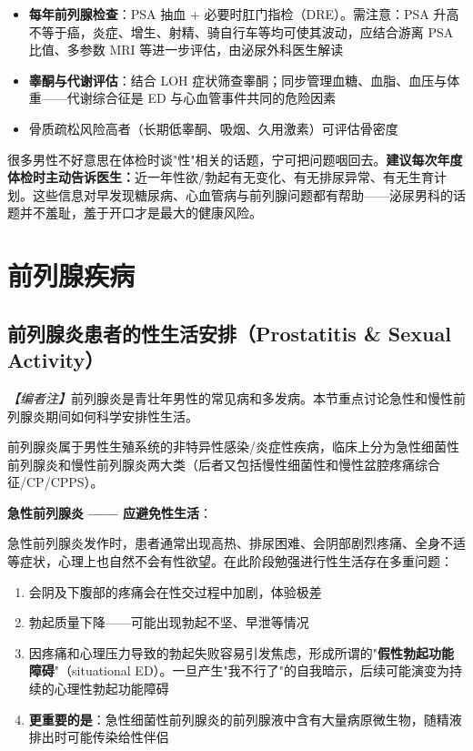\begin{itemize}
	\item \textbf{每年前列腺检查}：PSA 抽血 + 必要时肛门指检（DRE）。需注意：PSA 升高不等于癌，炎症、增生、射精、骑自行车等均可使其波动，应结合游离 PSA 比值、多参数 MRI 等进一步评估，由泌尿外科医生解读
	\item \textbf{睾酮与代谢评估}：结合 LOH 症状筛查睾酮；同步管理血糖、血脂、血压与体重——代谢综合征是 ED 与心血管事件共同的危险因素
	\item 骨质疏松风险高者（长期低睾酮、吸烟、久用激素）可评估骨密度
\end{itemize}

\begin{tcolorbox}[colback=pink!5!white,colframe=red!50!black,title=贴心小叮咛]
很多男性不好意思在体检时谈"性"相关的话题，宁可把问题咽回去。\textbf{建议每次年度体检时主动告诉医生：}近一年性欲/勃起有无变化、有无排尿异常、有无生育计划。这些信息对早发现糖尿病、心血管病与前列腺问题都有帮助——泌尿男科的话题并不羞耻，羞于开口才是最大的健康风险。
\end{tcolorbox}

\section{前列腺疾病}

\subsection{前列腺炎患者的性生活安排（Prostatitis \& Sexual Activity）}

\noindent\textit{【编者注】}前列腺炎是青壮年男性的常见病和多发病。本节重点讨论急性和慢性前列腺炎期间如何科学安排性生活。

\vspace{0.5em}
前列腺炎属于男性生殖系统的非特异性感染/炎症性疾病，临床上分为急性细菌性前列腺炎和慢性前列腺炎两大类（后者又包括慢性细菌性和慢性盆腔疼痛综合征/CP/CPPS）。

\vspace{0.5em}
\noindent\textbf{急性前列腺炎 —— 应避免性生活}：

急性前列腺炎发作时，患者通常出现高热、排尿困难、会阴部剧烈疼痛、全身不适等症状，心理上也自然不会有性欲望。在此阶段勉强进行性生活存在多重问题：

\begin{enumerate}
	\item 会阴及下腹部的疼痛会在性交过程中加剧，体验极差
	\item 勃起质量下降——可能出现勃起不坚、早泄等情况
	\item 因疼痛和心理压力导致的勃起失败容易引发焦虑，形成所谓的"\textbf{假性勃起功能障碍}"（situational ED）。一旦产生"我不行了"的自我暗示，后续可能演变为持续的心理性勃起功能障碍
	\item \textbf{更重要的是}：急性细菌性前列腺炎的前列腺液中含有大量病原微生物，随精液排出时可能传染给性伴侣
\end{enumerate}

